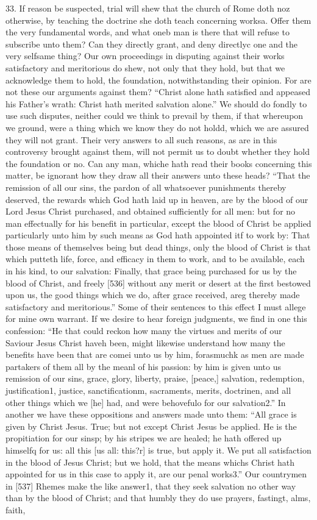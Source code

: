 33. If reason be suspected, trial will shew that the church of Rome doth noz otherwise, by teaching the doctrine she doth teach concerning worksa. Offer them the very fundamental words, and what oneb man is there that will refuse to subscribe unto them? Can they directly grant, and deny directlyc one and the very selfsame thing? Our own proceedings in disputing against their works satisfactory and meritorious do shew, not only that they hold, but that we acknowledge them to hold, the foundation, notwithstanding their opinion. For are not these our arguments against them? “Christ alone hath satisfied and appeased his Father’s wrath: Christ hath merited salvation alone.” We should do fondly to use such disputes, neither could we think to prevail by them, if that whereupon we ground, were a thing which we know they do not holdd, which we are assured they will not grant. Their very answers to all such reasons, as are in this controversy brought against them, will not permit us to doubt whether they hold the foundation or no. Can any man, whiche hath read their books concerning this matter, be ignorant how they draw all their answers unto these heads? “That the remission of all our sins, the pardon of all whatsoever punishments thereby deserved, the rewards which God hath laid up in heaven, are by the blood of our Lord Jesus Christ purchased, and obtained sufficiently for all men: but for no man effectually for his benefit in particular, except the blood of Christ be applied particularly unto him by such means as God hath appointed itf to work by: That those means of themselves being but dead things, only the blood of Christ is that which putteth life, force, and efficacy in them to work, and to be available, each in his kind, to our salvation: Finally, that grace being purchased for us by the blood of Christ, and freely [536] without any merit or desert at the first bestowed upon us, the good things which we do, after grace received, areg thereby made satisfactory and meritorious.” Some of their sentences to this effect I must allege for mine own warrant. If we desire to hear foreign judgments, we find in one this confession: “He that could reckon how many the virtues and merits of our Saviour Jesus Christ haveh been, might likewise understand how many the benefits have been that are comei unto us by him, forasmuchk as men are made partakers of them all by the meanl of his passion: by him is given unto us remission of our sins, grace, glory, liberty, praise, [peace,] salvation, redemption, justification1, justice, sanctificationm, sacraments, merits, doctrinen, and all other things which we [he] had, and were behovefulo for our salvation2.” In another we have these oppositions and answers made unto them: “All grace is given by Christ Jesus. True; but not except Christ Jesus be applied. He is the propitiation for our sinsp; by his stripes we are healed; he hath offered up himselfq for us: all this [us all: this?r] is true, but apply it. We put all satisfaction in the blood of Jesus Christ; but we hold, that the means whichs Christ hath appointed for us in this case to apply it, are our penal works3.” Our countrymen in [537] Rhemes make the like answer1, that they seek salvation no other way than by the blood of Christ; and that humbly they do use prayers, fastingt, alms, faith, 
